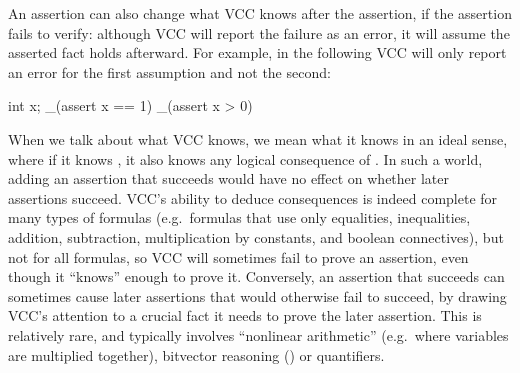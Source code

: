 
An assertion can also change what VCC knows after the assertion, if
the assertion fails to verify: although VCC will report the failure as an error,
it will assume the asserted fact holds afterward. For example, in the following
VCC will only report an error for the first assumption and not the second:
\begin{VCC}
int x;
_(assert x == 1)
_(assert x > 0)
\end{VCC}


When we talk about what VCC knows, we mean what it knows in an ideal
sense, where if it knows , it also knows any logical
consequence of . In such a world, adding an assertion that
succeeds would have no effect on whether later assertions succeed.
VCC's ability to deduce consequences is indeed complete for many types
of formulas (e.g.\ formulas that use only equalities,
inequalities, addition, subtraction, multiplication by constants, and
boolean connectives), but not for all formulas, so VCC will
sometimes fail to prove an assertion, even though it ``knows'' enough
to prove it.  Conversely, an assertion that succeeds can sometimes cause later assertions that
would otherwise fail to succeed, by drawing VCC's attention to a
crucial fact it needs to prove the later assertion.  This is
relatively rare, and typically involves ``nonlinear arithmetic''
(e.g.\ where variables are multiplied together), bitvector reasoning
() or quantifiers.

